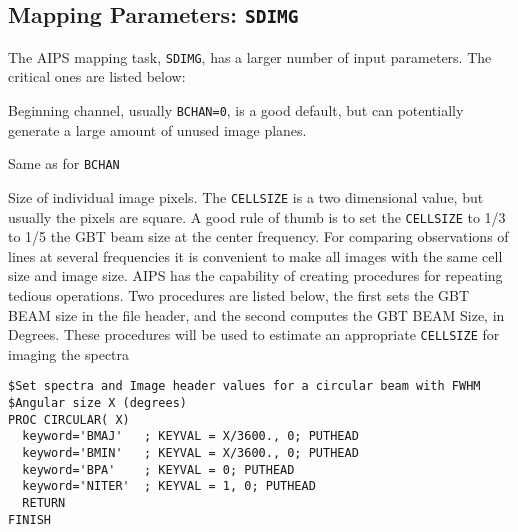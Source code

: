 \documentclass[12pt,twoside]{article}
\newcommand{\myitem}[1]{\item{\makebox[1.25in][l]{{\tt #1}}}}
\begin{document}
\subsection{Mapping Parameters: {\tt SDIMG}}

The AIPS mapping task, {\tt SDIMG}, has a larger number of input parameters.  The
critical ones are listed below:
\begin{description}
\myitem{BCHAN} Beginning channel,  usually {\tt BCHAN=0}, is a good default,
but can potentially generate a large amount of unused image planes.
\myitem{ECHAN} Same as for {\tt BCHAN}
\myitem{CELLSIZE}  Size of individual image pixels.   The {\tt CELLSIZE} is a two
dimensional value, but usually the pixels are square.   A good rule of thumb is to set
the {\tt CELLSIZE} to 1/3 to 1/5 the GBT beam size at the center frequency.
For comparing observations of lines at several frequencies it is convenient to 
make all images with the same cell size and image size.    AIPS has the
capability of creating procedures for repeating tedious operations.  Two procedures
are listed below, the first sets the GBT BEAM size in the file header, and
the second computes the GBT BEAM Size, in Degrees.   These procedures
will be used to estimate an appropriate {\tt CELLSIZE} for imaging
the spectra
\begin{verbatim}
$Set spectra and Image header values for a circular beam with FWHM
$Angular size X (degrees)
PROC CIRCULAR( X)
  keyword='BMAJ'   ; KEYVAL = X/3600., 0; PUTHEAD 
  keyword='BMIN'   ; KEYVAL = X/3600., 0; PUTHEAD 
  keyword='BPA'    ; KEYVAL = 0; PUTHEAD 
  keyword='NITER'  ; KEYVAL = 1, 0; PUTHEAD
  RETURN
FINISH


\end{verbatim}
\end{description}
\end{document}
